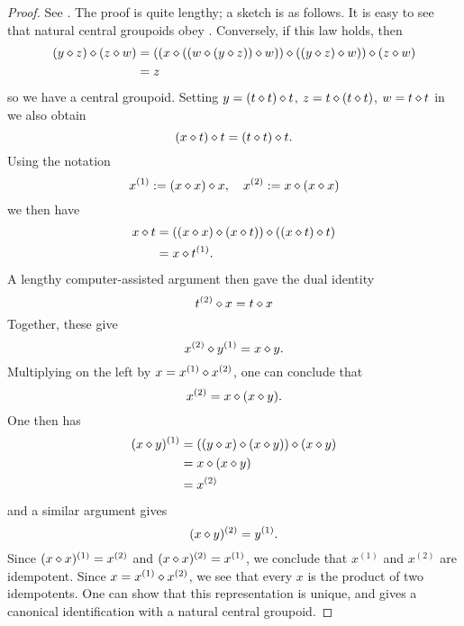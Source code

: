 \begin{proof}
  See \cite[Theorem 5]{knuth}.  The proof is quite lengthy; a sketch is as follows. It is easy to see that natural central groupoids obey .  Conversely, if this law holds, then
\begin{align*}
  (y \diamond z) \diamond (z \diamond w) &= (( x \diamond ((w \diamond (y \diamond z)) \diamond w)) \diamond ((y \diamond z) \diamond w)) \diamond (z \diamond w)\\
  &= z
\end{align*}
so we have a central groupoid.  Setting $y = (t \diamond t) \diamond t$, $z = t \diamond (t \diamond t)$, $w = t \diamond t$ in  we also obtain
$$ (x \diamond t) \diamond t = (t \diamond t) \diamond t.$$
Using the notation
$$ x^{(1)} := (x \diamond x) \diamond x, \quad x^{(2)} := x \diamond (x \diamond x)$$
we then have
\begin{align*}
  x \diamond t &= ((x \diamond x) \diamond (x \diamond t)) \diamond ((x \diamond t) \diamond t) \\
  &= x \diamond t^{(1)}.
\end{align*}
A lengthy computer-assisted argument then gave the dual identity
$$ t^{(2)} \diamond x = t \diamond x$$
Together, these give
$$ x^{(2)} \diamond y^{(1)} = x \diamond y.$$
Multiplying on the left by $x = x^{(1)}\diamond x^{(2)}$, one can conclude that
$$ x^{(2)} = x \diamond (x \diamond y).$$
One then has
\begin{align*}
  (x \diamond y)^{(1)} &= ((y \diamond x) \diamond (x \diamond y)) \diamond (x \diamond y) \\
&= x \diamond (x \diamond y) \\
&= x^{(2)}
\end{align*}
and a similar argument gives
$$ (x \diamond y)^{(2)} = y^{(1)}.$$
Since $(x \diamond x)^{(1)} = x^{(2)}$ and $(x \diamond x)^{(2)} = x^{(1)}$, we conclude that $x^{(1)}$ and $x^{(2)}$ are idempotent.  Since $x = x^{(1)} \diamond x^{(2)}$, we see that every $x$ is the product of two idempotents.  One can show that this representation is unique, and gives a canonical identification with a natural central groupoid.
\end{proof}

